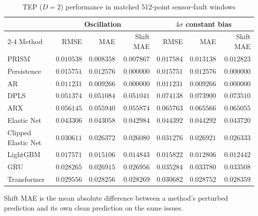 \begin{table}[!t]
\centering
\caption{TEP ($D=2$) performance in matched 512-point sensor-fault windows}
\label{tab:fault-tep-d2}
\small
\begin{tabular}{lrrrrrr}
\hline
 & \multicolumn{3}{c}{Oscillation} & \multicolumn{3}{c}{$4\sigma$ constant bias} \\
\cline{2-4}\cline{5-7}
Method & RMSE & MAE & Shift MAE & RMSE & MAE & Shift MAE \\
\hline
PRISM & \(0.010538\) & \(0.008358\) & \(0.007867\) & \(0.017584\) & \(0.013138\) & \(0.012823\) \\
Persistence & \(0.015751\) & \(0.012576\) & \(0.000000\) & \(0.015751\) & \(0.012576\) & \(0.000000\) \\
AR & \(0.011231\) & \(0.009266\) & \(0.000000\) & \(0.011231\) & \(0.009266\) & \(0.000000\) \\
DPLS & \(0.051374\) & \(0.051084\) & \(0.051041\) & \(0.074138\) & \(0.073900\) & \(0.073510\) \\
ARX & \(0.056145\) & \(0.055940\) & \(0.055874\) & \(0.065763\) & \(0.065566\) & \(0.065055\) \\
Elastic Net & \(0.043306\) & \(0.043058\) & \(0.042984\) & \(0.044392\) & \(0.044292\) & \(0.043720\) \\
Clipped Elastic Net & \(0.030611\) & \(0.026372\) & \(0.026080\) & \(0.031276\) & \(0.026921\) & \(0.026333\) \\
LightGBM & \(0.017571\) & \(0.015106\) & \(0.014843\) & \(0.015822\) & \(0.012806\) & \(0.012442\) \\
GRU & \(0.028265\) & \(0.026915\) & \(0.026956\) & \(0.035284\) & \(0.033780\) & \(0.033508\) \\
Transformer & \(0.029556\) & \(0.028256\) & \(0.028269\) & \(0.030682\) & \(0.028752\) & \(0.028359\) \\
\hline
\end{tabular}
\par\smallskip
\parbox{0.96\textwidth}{\footnotesize Shift MAE is the mean absolute difference between a method's perturbed prediction and its own clean prediction on the same issues.}
\end{table}

